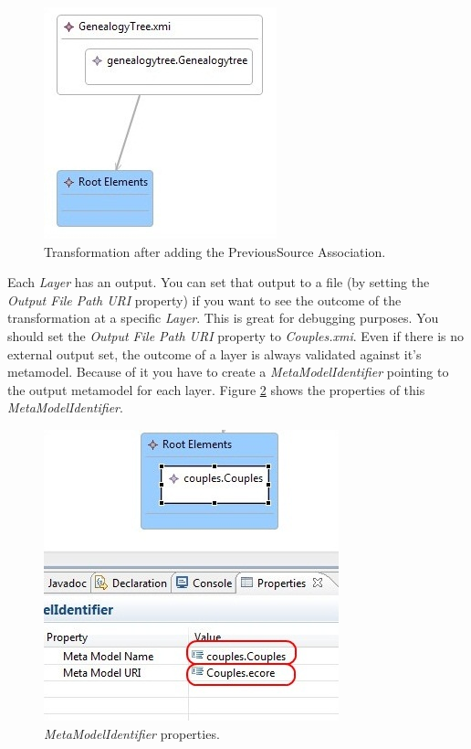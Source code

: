 \begin{figure}[h]
\begin{center}
  \includegraphics[scale=0.7]{imgs/after_previous_source.jpg}
  \caption{Transformation after adding the PreviousSource Association.}
  \label{fig:after_previous_source}
\end{center}
\end{figure}

Each \emph{Layer} has an output. You can set that output to a file (by setting
the \emph{Output File Path URI} property) if you want to see the outcome of the
transformation at a specific \emph{Layer}. This is great for debugging purposes.
You should set the \emph{Output File Path URI} property to \emph{Couples.xmi}.
Even if there is no external output set, the outcome of a
layer is always validated against it's metamodel. Because of it you have to
create a \emph{MetaModelIdentifier} pointing to the output metamodel for each layer.
Figure \ref{fig:metamodelid_l1} shows the properties of this
\emph{MetaModelIdentifier}.


\begin{figure}[h]
\begin{center}
  \includegraphics[scale=0.7]{imgs/metamodelid_l1.jpg}
  \caption{\emph{MetaModelIdentifier} properties.}
  \label{fig:metamodelid_l1}
\end{center}
\end{figure}


